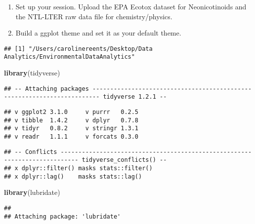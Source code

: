 \documentclass[]{article}
\newenvironment{Shaded}{\begin{snugshade}}{\end{snugshade}}
\newcommand{\KeywordTok}[1]{\textcolor[rgb]{0.13,0.29,0.53}{\textbf{#1}}}
\newcommand{\CommentTok}[1]{\textcolor[rgb]{0.56,0.35,0.01}{\textit{#1}}}
\newcommand{\NormalTok}[1]{#1}
\begin{document}
\begin{enumerate}
\def\labelenumi{\arabic{enumi}.}
\item
  Set up your session. Upload the EPA Ecotox dataset for Neonicotinoids
  and the NTL-LTER raw data file for chemistry/physics.
\item
  Build a ggplot theme and set it as your default theme.
\end{enumerate}

\begin{Shaded}
\end{Shaded}

\begin{verbatim}
## [1] "/Users/carolinereents/Desktop/Data Analytics/EnvironmentalDataAnalytics"
\end{verbatim}

\begin{Shaded}
\begin{Highlighting}[]
\KeywordTok{library}\NormalTok{(tidyverse)}
\end{Highlighting}
\end{Shaded}

\begin{verbatim}
## -- Attaching packages ------------------------------------------------------------------------ tidyverse 1.2.1 --
\end{verbatim}

\begin{verbatim}
## v ggplot2 3.1.0     v purrr   0.2.5
## v tibble  1.4.2     v dplyr   0.7.8
## v tidyr   0.8.2     v stringr 1.3.1
## v readr   1.1.1     v forcats 0.3.0
\end{verbatim}

\begin{verbatim}
## -- Conflicts --------------------------------------------------------------------------- tidyverse_conflicts() --
## x dplyr::filter() masks stats::filter()
## x dplyr::lag()    masks stats::lag()
\end{verbatim}

\begin{Shaded}
\begin{Highlighting}[]
\KeywordTok{library}\NormalTok{(lubridate)}
\end{Highlighting}
\end{Shaded}

\begin{verbatim}
## 
## Attaching package: 'lubridate'
\end{verbatim}
\end{document}
